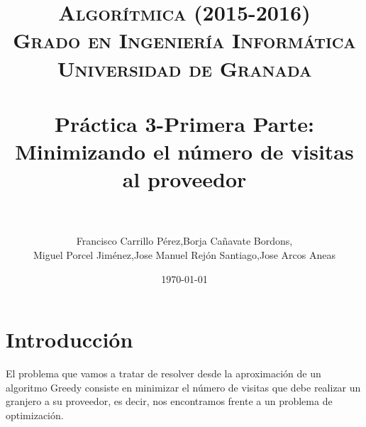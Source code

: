 
 \usepackage{algpseudocode}

\title{	
\normalfont \normalsize 
\textsc{{\bf Algorítmica (2015-2016)} \\ Grado en Ingeniería Informática \\ Universidad de Granada} \\ [25pt] %
\horrule{0.5pt} \\[0.4cm] %
\huge Práctica 3-Primera Parte: Minimizando el número de visitas al proveedor \\ %
\horrule{2pt} \\[0.5cm] %
}

\author{Francisco Carrillo Pérez,Borja Cañavate Bordons, \\Miguel Porcel Jiménez,Jose Manuel Rejón Santiago,Jose Arcos Aneas} %

\date{\normalsize\today} %




\maketitle %

\newpage %

\tableofcontents %

\listoffigures

\listoftables

\newpage

\section{Introducción }

El problema que vamos a tratar de resolver desde la aproximación de un algoritmo Greedy consiste en minimizar el número de visitas que debe realizar un granjero a su proveedor, es decir, nos encontramos frente a un problema de optimización.

